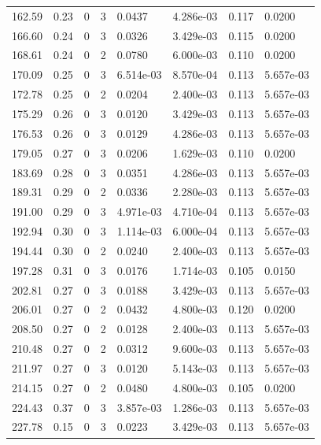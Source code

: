 \documentclass[preview]{standalone}
\begin{document}
{{{\begin{tabular}{L{1.2cm}C{1.2cm} C{0.3cm}C{0.5cm} C{1.4cm}C{1.4cm} C{1.4cm}C{1.4cm}}
  162.59  &  0.23  & 0     &  3 &  0.0437  & 4.286e-03  & 0.117 &  0.0200   \\ 
  166.60  &  0.24  & 0     &  3 &  0.0326  & 3.429e-03  & 0.115 &  0.0200   \\ 
  168.61  &  0.24  & 0     &  2 &  0.0780  & 6.000e-03  & 0.110 &  0.0200   \\ 
  170.09  &  0.25  & 0     &  3 &  6.514e-03  & 8.570e-04  & 0.113 &  5.657e-03   \\ 
  172.78  &  0.25  & 0     &  2 &  0.0204  & 2.400e-03  & 0.113 &  5.657e-03   \\ 
  175.29  &  0.26  & 0     &  3 &  0.0120  & 3.429e-03  & 0.113 &  5.657e-03   \\ 
  176.53  &  0.26  & 0     &  3 &  0.0129  & 4.286e-03  & 0.113 &  5.657e-03   \\ 
  179.05  &  0.27  & 0     &  3 &  0.0206  & 1.629e-03  & 0.110 &  0.0200   \\ 
  183.69  &  0.28  & 0     &  3 &  0.0351  & 4.286e-03  & 0.113 &  5.657e-03   \\ 
  189.31  &  0.29  & 0     &  2 &  0.0336  & 2.280e-03  & 0.113 &  5.657e-03   \\ 
  191.00  &  0.29  & 0     &  3 &  4.971e-03  & 4.710e-04  & 0.113 &  5.657e-03   \\ 
  192.94  &  0.30  & 0     &  3 &  1.114e-03  & 6.000e-04  & 0.113 &  5.657e-03   \\ 
  194.44  &  0.30  & 0     &  2 &  0.0240  & 2.400e-03  & 0.113 &  5.657e-03   \\ 
  197.28  &  0.31  & 0     &  3 &  0.0176  & 1.714e-03  & 0.105 &  0.0150   \\ 
  202.81  &  0.27  & 0     &  3 &  0.0188  & 3.429e-03  & 0.113 &  5.657e-03   \\ 
  206.01  &  0.27  & 0     &  2 &  0.0432  & 4.800e-03  & 0.120 &  0.0200   \\ 
  208.50  &  0.27  & 0     &  2 &  0.0128  & 2.400e-03  & 0.113 &  5.657e-03   \\ 
  210.48  &  0.27  & 0     &  2 &  0.0312  & 9.600e-03  & 0.113 &  5.657e-03   \\ 
  211.97  &  0.27  & 0     &  3 &  0.0120  & 5.143e-03  & 0.113 &  5.657e-03   \\ 
  214.15  &  0.27  & 0     &  2 &  0.0480  & 4.800e-03  & 0.105 &  0.0200   \\ 
  224.43  &  0.37  & 0     &  3 &  3.857e-03  & 1.286e-03  & 0.113 &  5.657e-03   \\ 
  227.78  &  0.15  & 0     &  3 &  0.0223  & 3.429e-03  & 0.113 &  5.657e-03   \\ 

\end{tabular}}}}
\end{document}
